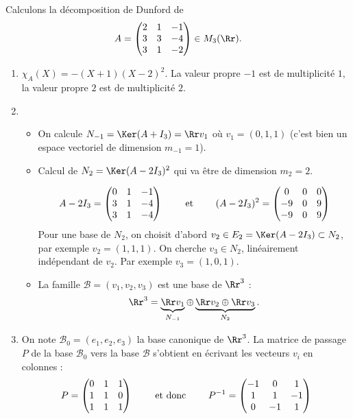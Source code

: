 \documentclass[12pt, class=report,crop=false]{standalone}
\begin{document}
\begin{exemple}
Calculons la décomposition de Dunford de
$$A=\begin{pmatrix}2&1&-1\cr 3&3&-4\cr 3&1&-2\end{pmatrix} \in M_3(\Rr).$$

\begin{enumerate}
  \item $\chi_A(X)=-(X+1)(X-2)^2$.
 La valeur propre $-1$ est de multiplicité $1$, la valeur propre $2$ est de multiplicité $2$.  
 
  \item 
  \begin{itemize}
    \item On calcule $N_{-1}=\Ker(A+I_3) = \Rr v_1$ où $v_1 =(0,1,1)$ (c'est bien un espace vectoriel de dimension $m_{-1} = 1$).
    
    \item Calcul de $N_2=\Ker(A-2I_3)^2$ qui va être de dimension $m_2=2$.
    
    $$A-2I_3 = \begin{pmatrix}0&1&-1\cr 3&1&-4\cr 3&1&-4\end{pmatrix}
    \qquad \text{ et } \qquad 
    (A-2I_3)^2 = \begin{pmatrix}0&0&0\cr -9&0&9\cr -9&0&9\end{pmatrix}$$
    Pour une base de $N_2$, on choisit d'abord 
    $v_2 \in E_2 = \Ker(A-2I_3) \subset N_2$, 
    par exemple $v_2 = (1,1,1)$.
    On cherche $v_3 \in N_2$, linéairement indépendant de $v_2$.
    Par exemple $v_3 = (1,0,1)$. 
    
    \item La famille $\mathcal{B} = (v_1,v_2,v_3)$ est une base de $\Rr^3$ :
    $$\Rr^3 = \underbrace{\Rr v_1 }_{N_{-1}} \oplus \underbrace{\Rr v_2 \oplus \Rr v_3}_{N_2}.$$
    
  \end{itemize}  
  
  \item On note $\mathcal{B}_0 = (e_1,e_2,e_3)$ la base canonique de $\Rr^3$.
  La matrice de passage $P$ de la base $\mathcal{B}_0$ vers la base $\mathcal{B}$ s'obtient en écrivant les vecteurs $v_i$ en colonnes :
  $$P=\begin{pmatrix}0&1&1\cr 1&1&0\cr1&1&1\end{pmatrix}
  \qquad \text{ et donc } \qquad 
  P^{-1} = \begin{pmatrix}-1 & 0 & 1 \\1 & 1 & -1 \\0 & -1 & 1\end{pmatrix}$$
  

\end{enumerate}
\end{exemple}
\end{document}
